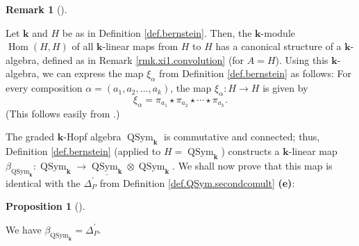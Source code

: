 \documentclass
[numbers=enddot,12pt,final,onecolumn,notitlepage,abstracton]{scrartcl}%
\theoremstyle{definition}
\newtheorem{prop}[theo]{Proposition}
\newenvironment{proposition}[1][]
{\begin{prop}[#1]\begin{leftbar}}
{\end{leftbar}\end{prop}}
\newtheorem{remk}[theo]{Remark}
\newenvironment{remark}[1][]
{\begin{remk}[#1]\begin{leftbar}}
{\end{leftbar}\end{remk}}
\begin{document}

\begin{remark}
\label{rmk.xi2.convolution}Let $\mathbf{k}$ and $H$ be as in Definition
\ref{def.bernstein}. Then, the $\mathbf{k}$-module $\operatorname*{Hom}\left(
H,H\right)  $ of all $\mathbf{k}$-linear maps from $H$ to $H$ has a canonical
structure of a $\mathbf{k}$-algebra, defined as in Remark
\ref{rmk.xi1.convolution} (for $A=H$). Using this $\mathbf{k}$-algebra, we can
express the map $\xi_{\alpha}$ from Definition \ref{def.bernstein} as
follows: For every composition $\alpha=\left(  a_{1},a_{2},\ldots
,a_{k}\right)  $, the map $\xi_{\alpha}:H\rightarrow H$ is given by%
\[
\xi_{\alpha}=\pi_{a_{1}}\star\pi_{a_{2}}\star\cdots\star\pi_{a_{k}}.
\]
(This follows easily from \cite[Exercise 1.4.23]{Reiner}.)
\end{remark}

The graded $\mathbf{k}$-Hopf algebra $\operatorname*{QSym}%
\nolimits_{\mathbf{k}}$ is commutative and connected; thus, Definition
\ref{def.bernstein} (applied to $H=\operatorname*{QSym}\nolimits_{\mathbf{k}}%
$) constructs a $\mathbf{k}$-linear map $\beta_{\operatorname*{QSym}%
\nolimits_{\mathbf{k}}}:\operatorname*{QSym}\nolimits_{\mathbf{k}}%
\rightarrow\underline{\operatorname*{QSym}\nolimits_{\mathbf{k}}}%
\otimes\operatorname*{QSym}\nolimits_{\mathbf{k}}$. We shall now prove that
this map is identical with the $\Delta_{P}^{\prime}$ from Definition
\ref{def.QSym.secondcomult} \textbf{(e)}:

\begin{proposition}
\label{prop.QSym.secondcomult.alt}We have $\beta_{\operatorname*{QSym}%
\nolimits_{\mathbf{k}}}=\Delta_{P}^{\prime}$.
\end{proposition}
\end{document}
